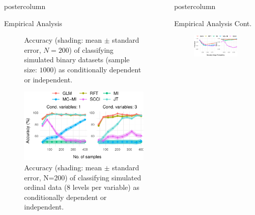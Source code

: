 \documentclass{beamer}
\newlength{\columnheight}
\begin{document}
\begin{frame}
\begin{columns}
\begin{column}{.33\textwidth}
\begin{beamercolorbox}[center]{postercolumn}
\begin{minipage}{.98\textwidth}
{\begin{myblock}{Empirical Analysis}
\begin{figure}
							\caption{Accuracy (shading: mean $\pm$ standard error, $N=200$) of classifying
							simulated binary datasets (sample size: $1000$) as conditionally
							dependent or independent.}
							\label{fig:cat_discrimination}
						\end{figure}
						\begin{figure}
							\centering
							\includegraphics[scale=3]{../in_person/imgs/accuracy_ordinal.pdf}
							\caption{Accuracy (shading: mean $\pm$ standard error, N=200) of
								classifying simulated ordinal data (8 levels per variable) as
								conditionally dependent or independent.}
							\label{fig:accuracy_ord}
						\end{figure}
					\end{myblock}
		}\end{minipage}\end{beamercolorbox}
	\end{column}
	\begin{column}{0.33\textwidth}
		\begin{beamercolorbox}[center]{postercolumn}
			\begin{minipage}{.98\textwidth} %
				\parbox[t][\columnheight]{\textwidth}{ %
					\begin{myblock}{Empirical Analysis Cont.}
						\begin{figure}
							\centering
							\includegraphics[scale=3]{../in_person/imgs/model_testing.pdf}

\end{figure}
\end{myblock}}
\end{minipage}
\end{beamercolorbox}
\end{column}
\end{columns}
\end{frame}
\end{document}
